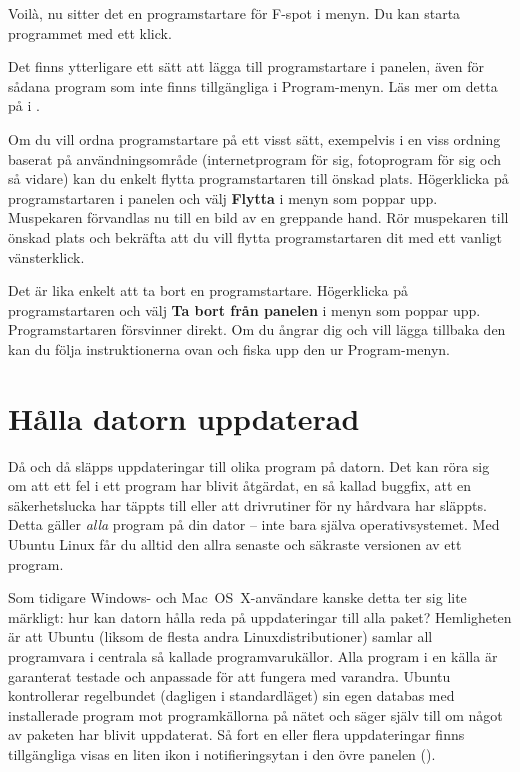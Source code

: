\documentclass[a4paper,final]{memoir} %
\begin{document}
Voilà, nu sitter det en programstartare för F-spot i menyn. Du kan starta programmet med ett klick.

Det finns ytterligare ett sätt att lägga till programstartare i panelen, även för sådana program som inte finns tillgängliga i Program-menyn. Läs mer om detta på  i .




Om du vill ordna programstartare på ett visst sätt, exempelvis i en viss ordning baserat på användningsområde (internetprogram för sig, fotoprogram för sig och så vidare) kan du enkelt flytta programstartaren till önskad plats. Högerklicka på programstartaren i panelen och välj \textbf{Flytta} i menyn som poppar upp. Muspekaren förvandlas nu till en bild av en greppande hand. Rör muspekaren till önskad plats och bekräfta att du vill flytta programstartaren dit med ett vanligt vänsterklick.

Det är lika enkelt att ta bort en programstartare. Högerklicka på programstartaren och välj \textbf{Ta bort från panelen} i menyn som poppar upp. Programstartaren försvinner direkt. Om du ångrar dig och vill lägga tillbaka den kan du följa instruktionerna ovan och fiska upp den ur Program-menyn.


\section{Hålla datorn uppdaterad}


Då och då släpps uppdateringar till olika program på datorn. Det kan röra sig om att ett fel i ett program har blivit åtgärdat, en så kallad buggfix, att en säkerhetslucka har täppts till eller att drivrutiner för ny hårdvara har släppts. Detta gäller \textit{alla} program på din dator -- inte bara själva operativsystemet. Med Ubuntu Linux får du alltid den allra senaste och säkraste versionen av ett program.

Som tidigare Windows- och Mac~OS~X-användare kanske detta ter sig lite märkligt: hur kan datorn hålla reda på uppdateringar till alla paket? Hemligheten är att Ubuntu (liksom de flesta andra Linuxdistributioner) samlar all programvara i centrala så kallade programvarukällor. Alla program i en källa är garanterat testade och anpassade för att fungera med varandra. Ubuntu kontrollerar regelbundet (dagligen i standardläget) sin egen databas med installerade program mot programkällorna på nätet och säger själv till om något av paketen har blivit uppdaterat. Så fort en eller flera uppdateringar finns tillgängliga visas en liten ikon i notifieringsytan i den övre panelen (). 
\end{document}
